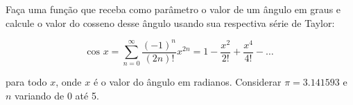 
\question[10]

Faça uma função que receba como parâmetro o valor de um ângulo em graus e calcule o valor do cosseno desse ângulo usando sua respectiva série de Taylor:

\begin{equation*}
	\text{cos } x = \sum_{n=0}^{\infty} \frac{(-1)^n}{(2n)!}x^{2n} = 1 - \frac{x^2}{2!} + \frac{x^4}{4!} - \ldots 
\end{equation*}

para todo $x$, onde $x$  é o valor do ângulo em radianos. Considerar $\pi = 3.141593$ e $n$ variando de 0 até 5.